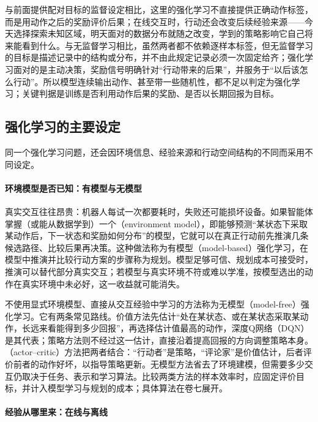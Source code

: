 与前面提供配对目标的监督设定相比，这里的强化学习不直接提供正确动作标签，而是用动作之后的奖励评价后果；在线交互时，行动还会改变后续经验来源——今天选择探索未知区域，明天面对的数据分布就随之改变，学到的策略影响它自己将来能看到什么。与无监督学习相比，虽然两者都不依赖逐样本标签，但无监督学习的目标是描述记录中的结构或分布，并不由此规定记录必须一次固定给齐；强化学习面对的是主动决策，奖励信号明确针对“行动带来的后果”，并服务于“以后该怎么行动”。所以模型连续输出动作、甚至带一些随机性，都不足以判定为强化学习；关键判据是训练是否利用动作后果的奖励、是否以长期回报为目标。

\subsection{强化学习的主要设定}

同一个强化学习问题，还会因环境信息、经验来源和行动空间结构的不同而采用不同设定。

\paragraph{环境模型是否已知：有模型与无模型}

真实交互往往昂贵：机器人每试一次都要耗时，失败还可能损坏设备。如果智能体掌握（或能从数据学到）一个（environment model），即能够预测“某状态下采取某动作后，下一状态和奖励如何分布”的模型，它就可以在真正行动前先推演几条候选路径、比较后果再决策。这种做法称为有模型（model-based）强化学习，在模型中推演并比较行动方案的步骤称为规划。模型足够可信、规划成本可接受时，推演可以替代部分真实交互；若模型与真实环境不符或难以学准，按模型选出的动作在真实环境中未必好，这一收益就可能消失。

不使用显式环境模型、直接从交互经验中学习的方法称为无模型（model-free）强化学习。它有两条常见路线。价值方法先估计“处在某状态、或在某状态采取某动作，长远来看能得到多少回报”，再选择估计值最高的动作，深度Q网络（DQN）是其代表；策略方法则不经过这一估计，直接沿着提高回报的方向调整策略本身。（actor--critic）方法把两者结合：“行动者”是策略，“评论家”是价值估计，后者评价前者的动作好坏，以指导策略更新。无模型方法省去了环境建模，但需要多少交互仍取决于任务、表示和学习算法。比较两类方法的样本效率时，应固定评价目标，并计入模型学习与规划的成本；具体算法在卷七展开。

\paragraph{经验从哪里来：在线与离线}

